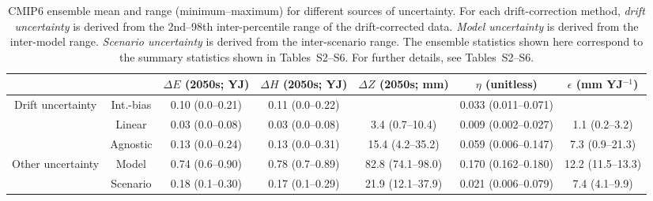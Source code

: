 \begin{table*}[t]
\centering
\caption{CMIP6 ensemble mean and range (minimum–maximum) for different sources of uncertainty. For each drift-correction method, \emph{drift uncertainty} is derived from the 2nd--98th inter-percentile range of the drift-corrected data. \emph{Model uncertainty} is derived from the inter-model range. \emph{Scenario uncertainty} is derived from the inter-scenario range. The ensemble statistics shown here correspond to the summary statistics shown in Tables~S2--S6. For further details, see Tables~S2--S6.}
\begin{tabular}{cc|c|c|c|c|c}
\toprule
 &  & $\Delta E$ (2050s; YJ) & $\Delta H$ (2050s; YJ) & $\Delta Z$ (2050s; mm) & $\eta$ (unitless) & $\epsilon$ (mm YJ$^{-1}$) \\
\midrule
\multirow[c]{3}{*}{Drift uncertainty} & Int.-bias & 0.10 (0.0–0.21) & 0.11 (0.0–0.22) &  & 0.033 (0.011–0.071) &  \\
 & Linear & 0.03 (0.0–0.08) & 0.03 (0.0–0.08) & 3.4 (0.7–10.4) & 0.009 (0.002–0.027) & 1.1 (0.2–3.2) \\
 & Agnostic & 0.13 (0.0–0.24) & 0.13 (0.0–0.31) & 15.4 (4.2–35.2) & 0.059 (0.006–0.147) & 7.3 (0.9–21.3) \\
\midrule
\multirow[c]{2}{*}{Other uncertainty} & Model & 0.74 (0.6–0.90) & 0.78 (0.7–0.89) & 82.8 (74.1–98.0) & 0.170 (0.162–0.180) & 12.2 (11.5–13.3) \\
 & Scenario & 0.18 (0.1–0.30) & 0.17 (0.1–0.29) & 21.9 (12.1–37.9) & 0.021 (0.006–0.079) & 7.4 (4.1–9.9) \\
\bottomrule
\end{tabular}
\end{table*}
